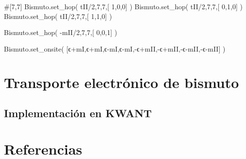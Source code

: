 \documentclass[
  letterpaper,
  DIV=11,
  numbers=noendperiod]{scrreprt}
\newenvironment{Shaded}{\begin{snugshade}}{\end{snugshade}}
\newcommand{\CommentTok}[1]{\textcolor[rgb]{0.37,0.37,0.37}{#1}}
\newcommand{\DecValTok}[1]{\textcolor[rgb]{0.68,0.00,0.00}{#1}}
\newcommand{\NormalTok}[1]{\textcolor[rgb]{0.00,0.23,0.31}{#1}}
\newcommand{\OperatorTok}[1]{\textcolor[rgb]{0.37,0.37,0.37}{#1}}
\newlength{\cslhangindent}
\newlength{\cslentryspacingunit} %
\newenvironment{CSLReferences}[2] %
 {%
  \setlength{\parindent}{0pt}
  \ifodd #1
  \let\oldpar\par
  \def\par{\hangindent=\cslhangindent\oldpar}
  \fi
  \setlength{\parskip}{#2\cslentryspacingunit}
 }%
 {}
\begin{document}
\begin{Shaded}
\begin{Highlighting}[]
\CommentTok{\#[7,7]}
\NormalTok{Bismuto.set\_hop(  tII}\OperatorTok{/}\DecValTok{2}\NormalTok{,}\DecValTok{7}\NormalTok{,}\DecValTok{7}\NormalTok{,[ }\DecValTok{1}\NormalTok{,}\DecValTok{0}\NormalTok{,}\DecValTok{0}\NormalTok{] ) }
\NormalTok{Bismuto.set\_hop(  tII}\OperatorTok{/}\DecValTok{2}\NormalTok{,}\DecValTok{7}\NormalTok{,}\DecValTok{7}\NormalTok{,[ }\DecValTok{0}\NormalTok{,}\DecValTok{1}\NormalTok{,}\DecValTok{0}\NormalTok{] ) }
\NormalTok{Bismuto.set\_hop(  tII}\OperatorTok{/}\DecValTok{2}\NormalTok{,}\DecValTok{7}\NormalTok{,}\DecValTok{7}\NormalTok{,[ }\DecValTok{1}\NormalTok{,}\DecValTok{1}\NormalTok{,}\DecValTok{0}\NormalTok{] ) }
 
\NormalTok{Bismuto.set\_hop( }\OperatorTok{{-}}\NormalTok{mII}\OperatorTok{/}\DecValTok{2}\NormalTok{,}\DecValTok{7}\NormalTok{,}\DecValTok{7}\NormalTok{,[ }\DecValTok{0}\NormalTok{,}\DecValTok{0}\NormalTok{,}\DecValTok{1}\NormalTok{] )}


\NormalTok{Bismuto.set\_onsite( [ϵ}\OperatorTok{+}\NormalTok{mI,ϵ}\OperatorTok{+}\NormalTok{mI,ϵ}\OperatorTok{{-}}\NormalTok{mI,ϵ}\OperatorTok{{-}}\NormalTok{mI,}\OperatorTok{{-}}\NormalTok{ϵ}\OperatorTok{+}\NormalTok{mII,}\OperatorTok{{-}}\NormalTok{ϵ}\OperatorTok{+}\NormalTok{mII,}\OperatorTok{{-}}\NormalTok{ϵ}\OperatorTok{{-}}\NormalTok{mII,}\OperatorTok{{-}}\NormalTok{ϵ}\OperatorTok{{-}}\NormalTok{mII] )}
\end{Highlighting}
\end{Shaded}


\hypertarget{transporte-electruxf3nico-de-bismuto}{%
\chapter{Transporte electrónico de
bismuto}\label{transporte-electruxf3nico-de-bismuto}}

\hypertarget{implementaciuxf3n-en-kwant}{%
\section{Implementación en KWANT}\label{implementaciuxf3n-en-kwant}}


\hypertarget{referencias}{%
\chapter*{Referencias}\label{referencias}}

\hypertarget{refs}{}
\begin{CSLReferences}{0}{0}
\end{CSLReferences}
\end{document}
